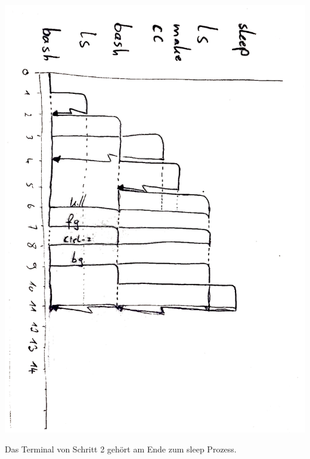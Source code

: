 \documentclass{ti2}
\begin{document}
\includegraphics[scale=0.3, angle=90]{image1.jpeg}



Das Terminal von Schritt 2 gehört am Ende zum sleep Prozess.
\end{document}
